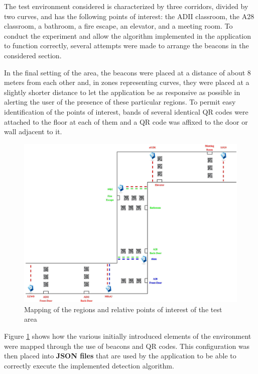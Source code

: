 The test environment considered is characterized by three corridors, divided by two curves, and has the following points of interest: the ADII classroom, the A28 classroom, a bathroom, a fire escape, an elevator, and a meeting room. To conduct the experiment and allow the algorithm implemented in the application to function correctly, several attempts were made to arrange the beacons in the considered section. 

In the final setting of the area, the beacons were placed at a distance of about 8 meters from each other and, in zones representing curves, they were placed at a slightly shorter distance to let the application be as responsive as possible in alerting the user of the presence of these particular regions. To permit easy identification of the points of interest, bands of several identical QR codes were attached to the floor at each of them and a QR code was affixed to the door or wall adjacent to it. 

\begin{figure}
    \centering
    \includegraphics[scale = 0.12]{chapters/experimental_results/images/regions_mapping.png}
    \caption{Mapping of the regions and relative points of interest of the test area} 
    \label{fig:regions_mapping}
\end{figure}
\noindent
Figure \ref{fig:regions_mapping} shows how the various initially introduced elements of the environment were mapped through the use of beacons and QR codes. This configuration was then placed into \textbf{JSON files} that are used by the application to be able to correctly execute the implemented detection algorithm.
